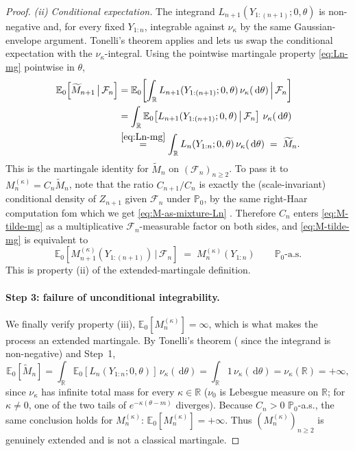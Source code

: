\documentclass[12pt, a4paper]{report}
\newcommand{\dd}{\,\mathrm{d}}
\newcommand{\1}{\mathbf{1}}
\begin{document}
\begin{proof}
\smallskip\noindent\emph{(ii) Conditional expectation.}
The integrand $L_{n+1}(Y_{1:(n+1)};0,\theta)$ is non-negative and, for every
fixed $Y_{1:n}$, integrable against $\nu_\kappa$ by the same Gaussian-envelope
argument. Tonelli's theorem applies and lets us swap the conditional
expectation with the $\nu_\kappa$-integral. Using the pointwise martingale
property \eqref{eq:Ln-mg} pointwise in $\theta$,
\begin{align}
   \mathbb{E}_0\!\left[\widetilde M_{n+1}\,\big|\,\mathcal{F}_n\right]
   &= \mathbb{E}_0\!\left[\int_\mathbb{R} L_{n+1}(Y_{1:(n+1)};0,\theta)\,
       \nu_\kappa(\dd\theta)\,\Big|\,\mathcal{F}_n\right]\notag\\
   &= \int_\mathbb{R} \mathbb{E}_0\!\left[L_{n+1}(Y_{1:(n+1)};0,\theta)\,\big|\,
       \mathcal{F}_n\right]\,\nu_\kappa(\dd\theta)\notag\\
   &\overset{\eqref{eq:Ln-mg}}{=} \int_\mathbb{R} L_n(Y_{1:n};0,\theta)\,
       \nu_\kappa(\dd\theta)
   \;=\; \widetilde M_n.
   \label{eq:M-tilde-mg}
\end{align}
This is the martingale identity for $\widetilde M_n$ on
$(\mathcal{F}_n)_{n\geq 2}$. To pass it to $M_n^{(\kappa)} = C_n\widetilde M_n$,
note that the ratio $C_{n+1}/C_n$ is exactly the (scale-invariant) conditional
density of $Z_{n+1}$ given $\mathcal{F}_n$ under $\mathbb{P}_0$, by the same right-Haar computation fom which we get \eqref{eq:M-as-mixture-Ln}  \cite[Cor.~4.6]{Wang2025}. Therefore $C_n$ enters
\eqref{eq:M-tilde-mg} as a multiplicative $\mathcal{F}_n$-measurable factor
on both sides, and \eqref{eq:M-tilde-mg} is equivalent to
\begin{equation}\label{eq:Mkappa-mg}
   \mathbb{E}_0\!\left[M_{n+1}^{(\kappa)}(Y_{1:(n+1)})\,\big|\,\mathcal{F}_n\right]
   \;=\; M_n^{(\kappa)}(Y_{1:n})
   \qquad\mathbb{P}_0\text{-a.s.}
\end{equation}
This is property (ii) of the extended-martingale definition.

\paragraph{Step 3: failure of unconditional integrability.}
We finally verify property (iii), $\mathbb{E}_0[M_n^{(\kappa)}] = \infty$, which
is what makes the process an extended martingale. By Tonelli's theorem
( since the integrand is non-negative) and Step~1,
\[
   \mathbb{E}_0\!\left[\widetilde M_n\right]
   = \int_\mathbb{R} \mathbb{E}_0\!\left[L_n(Y_{1:n};0,\theta)\right]\,
       \nu_\kappa(\dd\theta)
   = \int_\mathbb{R} 1\,\nu_\kappa(\dd\theta)
   = \nu_\kappa(\mathbb{R}) = +\infty,
\]
since $\nu_\kappa$ has infinite total mass for every $\kappa\in\mathbb{R}$
($\nu_0$ is Lebesgue measure on $\mathbb{R}$; for $\kappa\neq 0$, one of the
two tails of $e^{-\kappa(\theta-m)}$ diverges). Because $C_n > 0$
$\mathbb{P}_0$-a.s., the same conclusion holds for $M_n^{(\kappa)}$:
$\mathbb{E}_0[M_n^{(\kappa)}] = +\infty$. Thus $(M_n^{(\kappa)})_{n\geq 2}$ is
genuinely extended and is not a classical martingale.


\end{proof}
\end{document}
